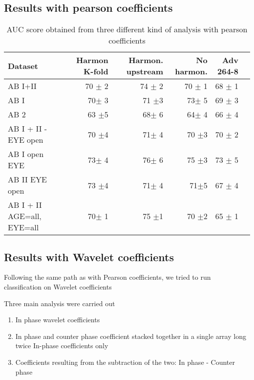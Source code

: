 \documentclass[a4paper,11pt]{article}
\begin{document}
\subsection{Results with pearson coefficients}

\begin{table}[!htp]\centering
\scriptsize
\begin{tabular}{lrrrrr}\toprule
Dataset &Harmon K-fold &Harmon. upstream &No harmon. &Adv 264-8 \\\midrule
AB I+II &70 $\pm$ 2 &74 $\pm$ 2 &70 $\pm$ 1 &68 $\pm$ 1 \\
AB I &70$\pm$ 3 &71 $\pm$3 &73$\pm$ 5 &69 $\pm$ 3 \\
AB 2 &63 $\pm$5 &68$\pm$ 6 &64$\pm$ 4 &66 $\pm$ 4 \\
AB I + II - EYE open &70 $\pm$4 &71$\pm$ 4 &70 $\pm$3 &70 $\pm$ 2 \\
AB I open EYE &73$\pm$ 4 &76$\pm$ 6 &75 $\pm$3 &73 $\pm$ 5 \\
AB II EYE open &73 $\pm$4 &71$\pm$ 4 &71$\pm$5 &67 $\pm$ 4 \\
AB I + II AGE=all, EYE=all &70$\pm$ 1 &75 $\pm$1 &70 $\pm$2 &65 $\pm$ 1 \\
\bottomrule
\end{tabular}
\caption{AUC score obtained from three different kind of analysis with pearson coefficients}\label{}
\end{table}

\newpage

\subsection{Results with Wavelet coefficients}

Following the same path as with Pearson coefficients, we tried to run classification on Wavelet coefficients

Three main analysis were carried out

\begin{enumerate}
\item In phase wavelet coefficients
\item In phase and counter phase coefficient stacked together in a single array long twice In-phase coefficients only
\item Coefficients resulting from the subtraction of the two: In phase - Counter phase
\end{enumerate}
\end{document}

